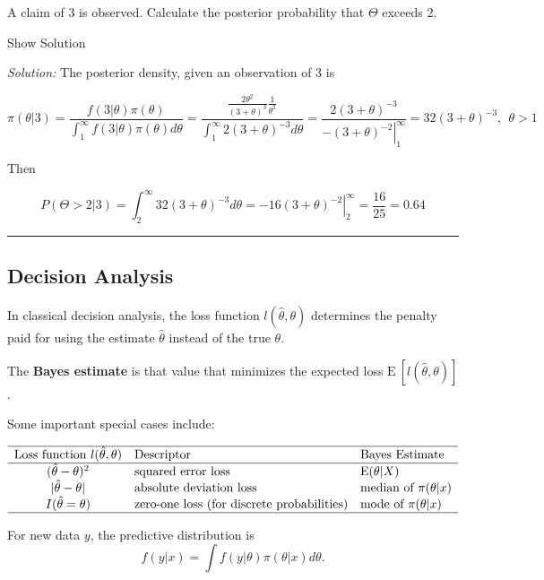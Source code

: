 \documentclass[]{book}
\theoremstyle{definition}
\theoremstyle{definition}
\theoremstyle{definition}
\theoremstyle{remark}
\begin{document}
A claim of 3 is observed. Calculate the posterior probability that
\(\Theta\) exceeds 2.

Show Solution

\hypertarget{toggleExamC43}{}
\emph{Solution:} The posterior density, given an observation of 3 is

\[\pi(\theta|3) =  \frac{f(3|\theta)\pi(\theta)}{\int_1^\infty f(3|\theta)\pi(\theta)d\theta} = 
\frac{\frac{2\theta^2}{(3+\theta)^3}\frac{1}{\theta^2}}{\int_1^\infty 2(3+\theta)^{-3} d\theta} = 
\frac{2(3+\theta)^{-3}}{\left. -(3+\theta)^{-2}\right|_1^\infty} = 32(3+\theta)^{-3}, \ \ \theta > 1\]

Then

\[P(\Theta>2|3) = \int_2^\infty 32(3+\theta)^{-3}d\theta = \left. -16(3+\theta)^{-2} \right|_2^\infty = \frac{16}{25} = 0.64\]

\begin{center}\rule{0.5\linewidth}{\linethickness}\end{center}

\subsection{Decision Analysis}\label{decision-analysis}

In classical decision analysis, the loss function
\(l(\hat{\theta}, \theta)\) determines the penalty paid for using the
estimate \(\hat{\theta}\) instead of the true \(\theta\).

The \textbf{Bayes estimate} is that value that minimizes the expected
loss \(\mathrm{E~}[ l(\hat{\theta}, \theta)]\).

Some important special cases include:

\[\begin{array}{cll}
\hline
\text{Loss function } l(\hat{\theta}, \theta) & \text{Descriptor} & \text{Bayes Estimate} \\
\hline 
(\hat{\theta}- \theta)^2 & \text{squared error loss} & \mathrm{E}(\theta|X) \\
|\hat{\theta}- \theta| & \text{absolute deviation loss} & \text{median of } \pi(\theta|x) \\
I(\hat{\theta} =\theta) & \text{zero-one loss (for discrete probabilities)} & \text{mode of } \pi(\theta|x) \\
\hline
\end{array}\]

For new data \(y\), the predictive distribution is
\[f(y|x) = \int f(y|\theta) \pi(\theta|x) d\theta .\]
\end{document}
